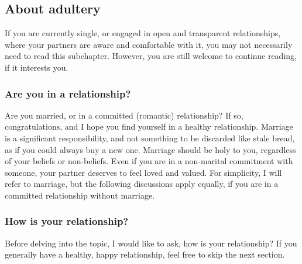 \documentclass[12pt,a5paper]{article}
\begin{document}
	\subsection{About adultery}
		If you are currently single,
		or engaged in open and transparent relationships,
		where your partners are aware and comfortable with it,
		you may not necessarily need to read this subchapter.
		However,
		you are still welcome to continue reading,
		if it interests you.

	\subsubsection{Are you in a relationship?}
		Are you married,
		or in a committed (romantic) relationship?
		If so,
		congratulations,
		and I hope you find yourself in a healthy relationship.
		Marriage is a significant responsibility,
		and not something to be discarded like stale bread,
		as if you could always buy a new one.
		Marriage should be holy to you,
		regardless of your beliefs or non-beliefs.
		Even if you are in a non-marital commitment with someone,
		your partner deserves to feel loved and valued.
		For simplicity,
		I will refer to marriage,
		but the following discussions apply equally,
		if you are in a committed relationship without marriage.

	\subsubsection{How is your relationship?}
		Before delving into the topic,
		I would like to ask,
		how is your relationship?
		If you generally have a healthy,
		happy relationship,
		feel free to skip the next section.
\end{document}
